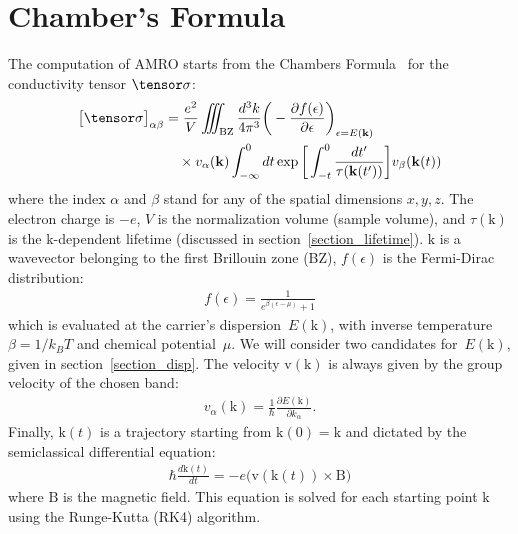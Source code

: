 \documentclass[aps,twocolumn,showpacs,nofootinbib]{revtex4-1}
\renewcommand{\vec}[1]{\bm{\mathrm{#1}}}
\begin{document}
\section{Chamber's Formula}
The computation of AMRO starts from the Chambers Formula~\cite{ashcroft_solid_1976} for the conductivity tensor $\tensor \sigma$:
\begin{align}
\big[\tensor \sigma \big]_{\alpha\beta} 
&=
\frac{e^2}{V}\iiint_{\text{BZ}}\frac{d^3k}{4\pi^3}
\bigg(
-\frac{\partial f(\epsilon)}{\partial \epsilon}
\bigg)_{\epsilon = E(\vec k)}
\nonumber\\
&\quad\times
v_{\alpha}(\vec k)
\int_{-\infty}^{0}dt \exp\bigg[\int_{-t}^{0}\frac{dt'}{\tau(\vec k(t'))}\bigg] v_{\beta}(\vec k(t))
\label{chambers}
\end{align}
where the index $\alpha$ and $\beta$ stand for any of the spatial dimensions $x,y,z$. The electron charge is $-e$, $V$ is the normalization volume (sample volume), and $\tau(\vec k)$ is the $\vec k$-dependent lifetime (discussed in section~\ref{section_lifetime}). $\vec k$ is a wavevector belonging to the first Brillouin zone (BZ), $f(\epsilon)$ is the Fermi-Dirac distribution:
\begin{align}
f(\epsilon) = \frac{1}{e^{\beta(\epsilon-\mu)}+1}
\end{align}
which is evaluated at the carrier's dispersion~$E(\vec k)$, with inverse temperature $\beta=1/k_{B}T$ and chemical potential~$\mu$. We will consider two candidates for~$E(\vec k)$, given in section~\ref{section_disp}. The velocity $\vec v(\vec k)$ is always given by the group velocity of the chosen band:
\begin{align}
v_{\alpha}(\vec k) = \frac{1}{\hbar}\frac{\partial E(\vec k)}{\partial k_\alpha}.
\end{align}
Finally, $\vec k(t)$ is a trajectory starting from $\vec k(0)=\vec k$ and dictated by the semiclassical differential equation:
\begin{align}
\hbar\frac{d\vec k(t)}{dt} =
-e \big(\vec v(\vec k(t))\times\vec B \big)
\label{semiClassicalMovement}
\end{align}
where $\vec B$ is the magnetic field. This equation is solved for each starting point $\vec k$ using the Runge-Kutta (RK4) algorithm.
\end{document}

